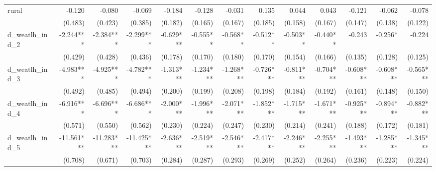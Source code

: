 \begin{tabular}{lrrrrrrrrrrrr}
rural                                       &       -0.120 &       -0.080 &       -0.069 &       -0.184 &       -0.128 &       -0.031 &        0.135 &        0.044 &        0.043 &       -0.121 &       -0.062 &       -0.078 \\ 
                                            &      (0.483) &      (0.423) &      (0.385) &      (0.182) &      (0.165) &      (0.167) &      (0.185) &      (0.158) &      (0.167) &      (0.147) &      (0.138) &      (0.122) \\ 
d\_weatlh\_ind\_2                           &    -2.244*** &    -2.384*** &    -2.299*** &    -0.629*** &     -0.555** &     -0.568** &     -0.512** &     -0.503** &     -0.440** &       -0.243 &      -0.256* &       -0.224 \\ 
                                            &      (0.429) &      (0.428) &      (0.436) &      (0.178) &      (0.170) &      (0.180) &      (0.170) &      (0.154) &      (0.166) &      (0.135) &      (0.128) &      (0.125) \\ 
d\_weatlh\_ind\_3                           &    -4.983*** &    -4.925*** &    -4.782*** &    -1.313*** &    -1.234*** &    -1.268*** &    -0.726*** &    -0.811*** &    -0.704*** &    -0.608*** &    -0.608*** &    -0.565*** \\ 
                                            &      (0.492) &      (0.485) &      (0.494) &      (0.200) &      (0.199) &      (0.208) &      (0.198) &      (0.184) &      (0.192) &      (0.161) &      (0.148) &      (0.150) \\ 
d\_weatlh\_ind\_4                           &    -6.916*** &    -6.696*** &    -6.686*** &    -2.000*** &    -1.996*** &    -2.071*** &    -1.852*** &    -1.715*** &    -1.671*** &    -0.925*** &    -0.894*** &    -0.882*** \\ 
                                            &      (0.571) &      (0.550) &      (0.562) &      (0.230) &      (0.224) &      (0.247) &      (0.230) &      (0.214) &      (0.241) &      (0.188) &      (0.172) &      (0.181) \\ 
d\_weatlh\_ind\_5                           &   -11.561*** &   -11.283*** &   -11.425*** &    -2.636*** &    -2.519*** &    -2.546*** &    -2.417*** &    -2.246*** &    -2.255*** &    -1.493*** &    -1.285*** &    -1.345*** \\ 
                                            &      (0.708) &      (0.671) &      (0.703) &      (0.284) &      (0.287) &      (0.293) &      (0.269) &      (0.252) &      (0.264) &      (0.236) &      (0.223) &      (0.224) \\ 

\end{tabular}
